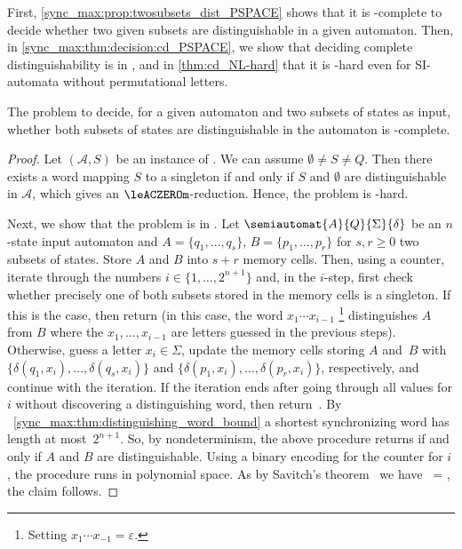 
First, \cref{sync_max:prop:twosubsets_dist_PSPACE} shows that it is \PSPACE-complete to decide whether two given subsets
are distinguishable in a given automaton. Then, in \cref{sync_max:thm:decision:cd_PSPACE}, we show
that deciding complete distinguishability is in \PSPACE, and in \cref{thm:cd_NL-hard} that it is \NL-hard even for SI-automata without permutational letters.

\begin{theorem}
	\label{sync_max:prop:twosubsets_dist_PSPACE}
	The problem to decide, for a given automaton and two subsets of states as input, whether both
	subsets of states are distinguishable in the automaton
	is \PSPACE-complete.
\end{theorem}
\begin{proof}	
	Let $(\mathcal A, S)$ be an instance of \SFS. We can assume $\emptyset \ne S \ne Q$.
	Then there exists a word mapping $S$ to a singleton
	if and only if $S$ and $\emptyset$ are distinguishable in $\mathcal A$,
	which gives an $\leACZEROm$-reduction.
	Hence, the problem is \PSPACE-hard.	
	
	Next, we show that the problem is in \PSPACE.
	Let $\semiautomat{A}{Q}{\Sigma}{\delta}$ be an $n$-state input automaton and 
	$A = \{q_1, \ldots, q_s\}$, $B = \{p_1, \ldots, p_r\}$
	for $s,r\ge 0$ two subsets of states.
	Store $A$ and $B$ into $s+r$ memory cells.		
	Then, using a counter, iterate through the numbers $i \in \{1,\ldots,2^{n+1}\}$
	and, in the $i$-step, first check
	whether precisely one of both subsets
	stored in the memory cells
	is a singleton.
	If this is the case,
	then return \rYES (in this
	case, the word $x_1 \cdots x_{i-1}$
	\footnote{Setting $x_1 \cdots x_{-1} = \varepsilon$.}
	distinguishes $A$ from $B$ where the $x_1, \ldots, x_{i-1}$ are letters guessed
	in the previous steps).	
	Otherwise, guess a letter $x_i \in \Sigma$, 
	update the memory cells storing $A$ and~$B$ with $\{ \delta(q_1, x_i), \ldots, \delta(q_s, x_i) \}$
	and $\{ \delta(p_1, x_i), \ldots, \delta(p_r, x_i) \}$, respectively,
	and continue with the iteration.
	If the iteration ends after going through
	all values for $i$ without discovering a distinguishing word, then return~\rNO.
	By \THM~\ref{sync_max:thm:distinguishing_word_bound} 
	a shortest synchronizing word has length at most~$2^{n+1}$.
	So, by nondeterminism, the above procedure returns \rYES
	if and only if $A$ and $B$ are distinguishable. 
	Using a binary encoding for the counter for $i$, 
	the procedure runs in polynomial space.
	As by Savitch's theorem~\cite{DBLP:journals/jcss/Savitch70} we have \NPSPACE\ = \PSPACE,  the claim follows.
\end{proof} 


